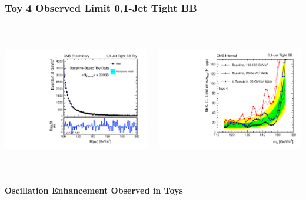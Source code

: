 \documentclass{beamer}
\begin{document}
\begin{frame}
\frametitle{Toy 4 Observed Limit 0,1-Jet Tight BB}
  \vspace{-1.5em}
  \begin{columns}[c]
    \column{60mm}
      \begin{center}
         \includegraphics[height=60mm]{wigglesStudy/toyFit5_Jets01PassPtG10BB_8TeV.pdf}
      \end{center}
    \column{60mm}
      \begin{center}
         \includegraphics[height=60mm]{wigglesStudy/compareLimits_TightBB_toy4.pdf}
      \end{center}
  \end{columns}
  \begin{center}
    \textbf{Oscillation Enhancement Observed in Toys}
  \end{center}
\end{frame}
\end{document}
